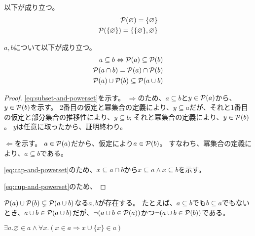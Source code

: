 \documentclass[uplatex,papersize,dvipdfmx]{jsarticle}
\begin{document}
    \begin{example}
      以下が成り立つ。
      \begin{align}
        \mathcal{P}(\varnothing) = \{\varnothing\} \\
        \mathcal{P}(\{\varnothing\}) = \{\{\varnothing\}, \varnothing\}
      \end{align}
    \end{example}
    \begin{theorem}
      $a, b$について以下が成り立つ。
      \begin{align}
        a \subseteq b \Leftrightarrow \mathcal{P}(a) \subseteq \mathcal{P}(b)\label{eq:subset-and-powerset}\\
        \mathcal{P}(a \cap b) = \mathcal{P}(a) \cap \mathcal{P}(b)\label{eq:cap-and-powerset}\\
        \mathcal{P}(a) \cup \mathcal{P}(b) \subseteq \mathcal{P}(a \cup b)\label{eq:cup-and-powerset}
      \end{align}
      \begin{proof}
        \eqref{eq:subset-and-powerset}を示す。
        $\Rightarrow$のため、$a \subseteq b$と$y \in \mathcal{P}(a)$から、$y \in \mathcal{P}(b)$を示す。
        2番目の仮定と冪集合の定義により、$y \subseteq a$だが、それと1番目の仮定と部分集合の推移性により、$y \subseteq b$;
        それと冪集合の定義により、$y \in \mathcal{P}(b)$。
        $y$は任意に取ったから、証明終わり。

        $\Leftarrow$を示す。
        $a \in \mathcal{P}(a)$だから、仮定により$a \in \mathcal{P}(b)$。
        すなわち、冪集合の定義により、$a \subseteq b$である。

        \eqref{eq:cap-and-powerset}のため、$x \subseteq a \cap b$から$x \subseteq a \land x \subseteq b$を示す。

        \eqref{eq:cup-and-powerset}のため、
      \end{proof}
      \begin{note}
        $\mathcal{P}(a) \cup \mathcal{P}(b) \subsetneq \mathcal{P}(a \cup b)$なる$a, b$が存在する。
        たとえば、$a \subseteq b$でも$b \subseteq a$でもないとき、$a \cup b \in \mathcal{P}(a \cup b)$だが、$\lnot (a \cup b \in \mathcal{P}(a))$かつ$\lnot (a \cup b \in \mathcal{P}(b))$である。
      \end{note}
    \end{theorem}
    \begin{axiom}[無限公理]
      $\exists a. \varnothing \in a \land \forall x. (x \in a \Rightarrow x \cup \{x\} \in a)$
    \end{axiom}
\end{document}
